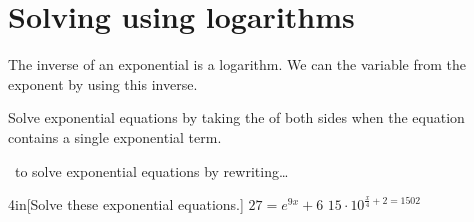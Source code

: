 \section{Solving using logarithms}

The inverse of an exponential is a logarithm.
We can  the variable from the exponent by using this inverse.

Solve exponential equations by taking the  of both sides 
when the equation contains a single exponential term.

\begin{myConceptSteps}{~to solve exponential equations by rewriting\dots}
\end{myConceptSteps}

\begin{my2Problems}[\normalsize]{4in}[Solve these exponential equations.]
    {
        $27 = e^{9x} + 6$
    }
    {
        $15 \cdot 10^{\frac{x}{4} + 2 = 1502}$
    }
\end{my2Problems}
